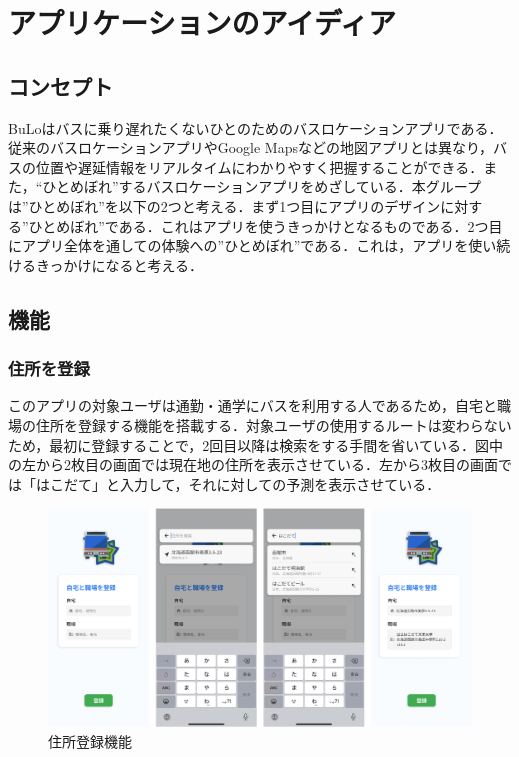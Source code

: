 \chapter{アプリケーションのアイディア}

\section{コンセプト}
BuLoはバスに乗り遅れたくないひとのためのバスロケーションアプリである．従来のバスロケーションアプリやGoogle Mapsなどの地図アプリとは異なり，バスの位置や遅延情報をリアルタイムにわかりやすく把握することができる．また，“ひとめぼれ”するバスロケーションアプリをめざしている．本グループは”ひとめぼれ”を以下の2つと考える．まず1つ目にアプリのデザインに対する”ひとめぼれ”である．これはアプリを使うきっかけとなるものである．2つ目にアプリ全体を通しての体験への”ひとめぼれ”である．これは，アプリを使い続けるきっかけになると考える．

\section{機能}
\subsection{住所を登録}
このアプリの対象ユーザは通勤・通学にバスを利用する人であるため，自宅と職場の住所を登録する機能を搭載する．対象ユーザの使用するルートは変わらないため，最初に登録することで，2回目以降は検索をする手間を省いている．図中の左から2枚目の画面では現在地の住所を表示させている．左から3枚目の画面では「はこだて」と入力して，それに対しての予測を表示させている．

\begin{figure}[htbp]
    \centering
    \includegraphics[width=12cm]{images/feature_registration.png}
    \caption{住所登録機能}
    \label{fig:feature_registration}
\end{figure}
\pagebreak
